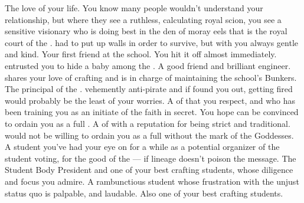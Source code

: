 \documentclass[char]{GL2020}
\begin{document}
\begin{contacts}
    \contact{\cPrince{}} The love of your life. You know many people wouldn't understand your relationship, but where they see a ruthless, calculating royal scion, you see a sensitive visionary who is doing \cPrince{\their} best in the den of moray eels that is the royal court of the \pFarm{}. \cPrince{\They} \cPrince{\have} had to put up walls in order to survive, but with you \cPrince{\they} \cPrince{\are} always gentle and kind.
    \contact{\cEthics{}} Your first friend at the school. You hit it off almost immediately. \cEthics{\They} entrusted you to hide a baby among the \pShippies{}.
    \contact{\cBunker{}} A good friend and brilliant engineer. \cBunker{} shares your love of crafting and is in charge of maintaining the school's Bunkers.
    \contact{\cPrincipal{}} The principal of the \pSchool{}. \cPrincipal{\They} \cPrincipal{\are} vehemently anti-pirate and if \cPrincipal{\they} found you out, getting fired would probably be the least of your worries.
    \contact{\cFlowPriest{}} A \cFlowPriest{\cleric} of \cFlow{} that you respect, and who has been training you as an initiate of the faith in secret. You hope \cFlowPriest{\they} can be convinced to ordain you as a full \cPirate{\cleric}.
    \contact{\cEbbPriest{}} A \cEbbPriest{\cleric} of \cEbb{} with a reputation for being strict and traditional. \cEbbPriest{\They} would not be willing to ordain you as a full \cPirate{\cleric} without the mark of the Goddesses.
    \contact{\cWarlordDaughter{}} A student you've had your eye on for a while as a potential organizer of the student voting, for the good of the \pShip{} — if \cWarlordDaughter{\their} lineage doesn't poison the message.
    \contact{\cPresident{}} The Student Body President and one of your best crafting students, whose diligence and focus you admire.
    \contact{\cPirateChild{}} A rambunctious student whose frustration with the unjust status quo is palpable, and laudable. Also one of your best crafting students.
\end{contacts}
\end{document}
